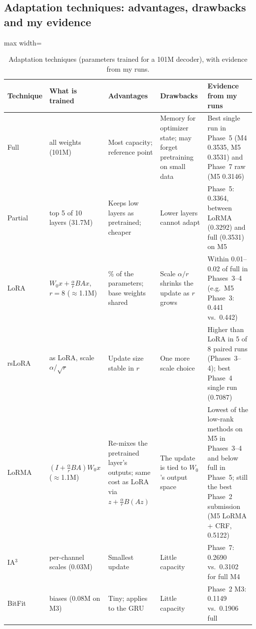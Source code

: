 \documentclass[11pt, oneside]{article}
\begin{document}
\subsection{Adaptation techniques: advantages, drawbacks and my evidence}\label{app:techs}
\begin{table}[H]
\centering\scriptsize
\caption{Adaptation techniques (parameters trained for a 101M decoder), with evidence from my runs.}
\label{tab:techwhy}
\begin{adjustbox}{max width=\textwidth}
\begin{tabular}{>{\raggedright\arraybackslash}p{1.4cm}>{\raggedright\arraybackslash}p{2.9cm}>{\raggedright\arraybackslash}p{3.1cm}>{\raggedright\arraybackslash}p{3.1cm}>{\raggedright\arraybackslash}p{4.4cm}}
\toprule
Technique & What is trained & Advantages & Drawbacks & Evidence from my runs\\
\midrule
Full & all weights (101M) & Most capacity; reference point & Memory for optimizer state; may forget pretraining on
small data & Best single run in Phase~5 (M4 0.3535, M5 0.3531) and Phase~7 raw (M5 0.3146)\\
\addlinespace
Partial & top 5 of 10 layers (31.7M) & Keeps low layers as pretrained; cheaper & Lower layers cannot adapt & Phase~5:
0.3364, between LoRMA (0.3292) and full (0.3531) on M5\\
\addlinespace
LoRA & $W_0x+\frac{\alpha}{r}BAx$, $r{=}8$ ($\approx$1.1M) & 1\% of the parameters; base weights shared & Scale
$\alpha/r$ shrinks the update as $r$ grows & Within 0.01--0.02 of full in Phases~3--4 (e.g.\ M5 Phase~3: 0.441 vs.\
0.442)\\
\addlinespace
rsLoRA & as LoRA, scale $\alpha/\sqrt r$ & Update size stable in $r$ & One more scale choice & Higher than LoRA in 5 of 8
paired runs (Phases~3--4); best Phase~4 single run (0.7087)\\
\addlinespace
LoRMA & $(I+\frac{\alpha}{r}BA)W_0x$ ($\approx$1.1M) & Re-mixes the pretrained layer's outputs; same cost as LoRA via
$z+\frac{\alpha}{r}B(Az)$ & The update is tied to $W_0$'s output space & Lowest of the low-rank methods on M5 in Phases~3--4 and below full in Phase~5;
still the best Phase~2 submission (M5 LoRMA + CRF, 0.5122)\\
\addlinespace
IA$^3$ & per-channel scales (0.03M) & Smallest update & Little capacity & Phase~7: 0.2690 vs.\ 0.3102 for full M4\\
\addlinespace
BitFit & biases (0.08M on M3) & Tiny; applies to the GRU & Little capacity & Phase~2 M3: 0.1149 vs.\ 0.1906 full\\

\end{tabular}
\end{adjustbox}
\end{table}
\end{document}
